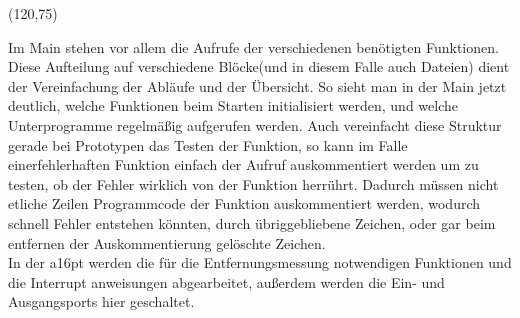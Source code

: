 \begin{minipage}{1\textwidth}
\begin{struktogramm}(120,75)
\forever
{}
\whileend
\whileend
\foreverend

\end{struktogramm}
\label{fig:Struktogramm der main}
\end{minipage}
Im Main stehen vor allem die Aufrufe der verschiedenen benötigten Funktionen. Diese Aufteilung auf verschiedene Blöcke(und in diesem Falle auch Dateien) dient der Vereinfachung der Abläufe und der Übersicht. So sieht man in der Main jetzt deutlich, welche Funktionen beim Starten initialisiert werden, und welche Unterprogramme regelmäßig aufgerufen werden. Auch vereinfacht diese Struktur gerade bei Prototypen das Testen der Funktion, so kann im Falle einerfehlerhaften Funktion einfach der Aufruf auskommentiert werden um zu testen, ob der Fehler wirklich von der Funktion herrührt. Dadurch müssen nicht etliche Zeilen Programmcode der Funktion auskommentiert werden, wodurch schnell Fehler entstehen könnten, durch übriggebliebene Zeichen, oder gar beim entfernen der Auskommentierung gelöschte Zeichen.\\%
In der a16pt werden die für die Entfernungsmessung notwendigen Funktionen und die Interrupt anweisungen abgearbeitet, außerdem werden die Ein- und Ausgangsports hier geschaltet.\\
